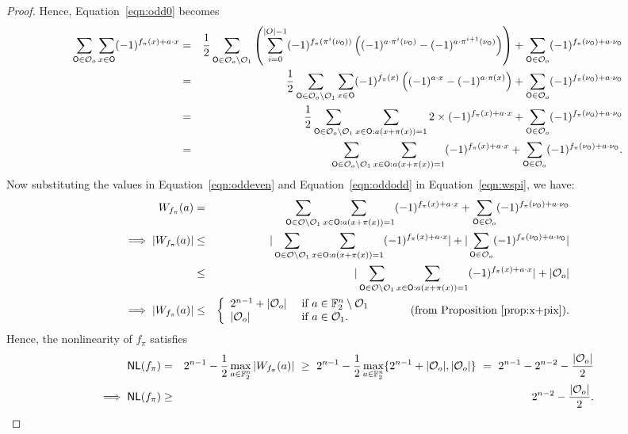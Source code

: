 \documentclass{llncs}
\begin{document}
\begin{proof}
Hence, Equation~\ref{eqn:odd0} becomes
\begin{eqnarray}\label{eqn:oddodd}
\sum_{\mathsf{O} \in \mathcal{O}_o} \sum_{x \in \mathsf{O}} (-1)^{ f_\pi(x) + a \cdot x}
& = & \frac{1}{2}\sum_{\mathsf{O} \in \mathcal{O}_o\setminus\mathcal{O}_1} 
\left(\sum_{i=0}^{|O|-1} (-1)^{f_\pi(\pi^i(\nu_{\mathsf{O}}))}
\left((-1)^{a \cdot \pi^i(\nu_{\mathsf{O}})} - (-1)^{a \cdot \pi^{i+1}(\nu_{\mathsf{O}})}\right)\right) + \sum_{\mathsf{O} \in \mathcal{O}_o} (-1)^{ f_\pi(\nu_{\mathsf{O}}) + a \cdot \nu_{\mathsf{O}}} \nonumber \\
& = & \frac{1}{2}\sum_{\mathsf{O} \in \mathcal{O}_o\setminus\mathcal{O}_1} 
\sum_{x \in \mathsf{O}} (-1)^{f_\pi(x)} \left((-1)^{a \cdot x} - (-1)^{a \cdot \pi(x)}\right) + \sum_{\mathsf{O} \in \mathcal{O}_o} (-1)^{ f_\pi(\nu_{\mathsf{O}}) + a \cdot \nu_{\mathsf{O}}} \nonumber \\
& = & \frac{1}{2}\sum_{\mathsf{O} \in \mathcal{O}_o\setminus\mathcal{O}_1} 
\sum_{x \in \mathsf{O} : a(x+\pi(x)) = 1} 2 \times (-1)^{f_\pi(x)+a\cdot x} + \sum_{\mathsf{O} \in \mathcal{O}_o} (-1)^{ f_\pi(\nu_{\mathsf{O}}) + a \cdot \nu_{\mathsf{O}}} \nonumber \\
& = & \sum_{\mathsf{O} \in \mathcal{O}_o\setminus\mathcal{O}_1} 
\sum_{x \in \mathsf{O} : a(x+\pi(x)) = 1} (-1)^{f_\pi(x)+a\cdot x} + \sum_{\mathsf{O} \in \mathcal{O}_o} (-1)^{ f_\pi(\nu_{\mathsf{O}}) + a \cdot \nu_{\mathsf{O}}}.
\end{eqnarray}
Now substituting the values in Equation~\ref{eqn:oddeven} and Equation~\ref{eqn:oddodd} in Equation~\ref{eqn:wspi}, we have:
\begin{eqnarray*}\label{eqn:wspi1}
W_{f_\pi}(a) & =  &
\sum_{\mathsf{O} \in \mathcal{O}\setminus\mathcal{O}_1}\sum_{x \in \mathsf{O}: a(x+\pi(x)) = 1}(-1)^{f_\pi(x)+a\cdot x}+\sum_{\mathsf{O} \in \mathcal{O}_o} (-1)^{ f_\pi(\nu_{\mathsf{O}}) + a \cdot \nu_{\mathsf{O}}} \nonumber \\
\implies |W_{f_\pi}(a)| & \leq  &
|\sum_{\mathsf{O} \in \mathcal{O}\setminus\mathcal{O}_1}\sum_{x \in \mathsf{O}: a(x+\pi(x)) = 1}(-1)^{f_\pi(x)+a\cdot x}|+|\sum_{\mathsf{O} \in \mathcal{O}_o} (-1)^{ f_\pi(\nu_{\mathsf{O}}) + a \cdot \nu_{\mathsf{O}}}|\nonumber \\
& \leq  & |\sum_{\mathsf{O} \in \mathcal{O}\setminus\mathcal{O}_1}\sum_{x \in \mathsf{O}: a(x+\pi(x)) = 1}(-1)^{f_\pi(x)+a\cdot x}|+|\mathcal{O}_o|\nonumber \\
\implies |W_{f_\pi}(a)| & \leq  & \left\{  \begin{array}{ll}
        2^{n-1}+ |\mathcal{O}_o| & \text{ if } a \in \mathbb{F}_2^n \setminus \mathcal{O}_1 \\
        |\mathcal{O}_o|        & \text{ if } a \in \mathcal{O}_1.
    \end{array}   \right.  ~~~~~~~~~\text{(from Proposition~\ref{prop:x+pix})}.
\end{eqnarray*}
Hence, the nonlinearity of $f_\pi$ satisfies
\begin{eqnarray*}
\mathsf{NL}(f_\pi) & = & 2^{n-1}-\frac{1}{2} \max_{a\in \mathbb{F}_2^n}| W_{f_\pi}(a)|
~\geq~ 2^{n-1}-\frac{1}{2} \max_{a\in \mathbb{F}_2^n} \{2^{n-1}+|\mathcal{O}_o|,|\mathcal{O}_o| \} ~=~ 2^{n-1} - 2^{n-2} - \frac{|\mathcal{O}_o|}{2} \\
\implies \mathsf{NL}(f_\pi) & \ge & 2^{n-2} - \frac{|\mathcal{O}_o|}{2}.
\end{eqnarray*}
\end{proof}
\end{document}

